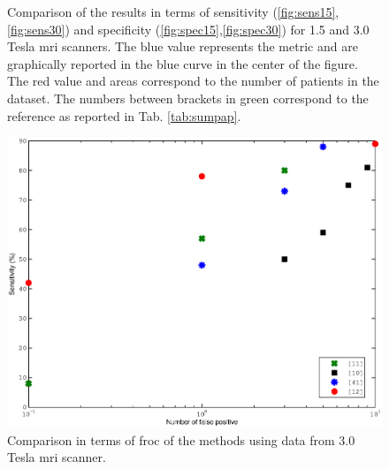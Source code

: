 \begin{figure}
{
  }
  \hspace*{\fill}
  \caption{Comparison of the results in terms of sensitivity (\ref{fig:sens15},\ref{fig:sens30}) and specificity (\ref{fig:spec15},\ref{fig:spec30}) for 1.5 and 3.0 Tesla \ac{mri} scanners. The {\color{blue}blue} value represents the metric and are graphically reported in the blue curve in the center of the figure. The {\color{red}red} value and areas correspond to the number of patients in the dataset. The numbers between brackets in {\color{semiAuto}green} correspond to the reference as reported in Tab. \ref{tab:sumpap}.}
  \label{fig:sensspec}
\end{figure}

\begin{figure}
  \centering
  \includegraphics[width=.6\linewidth]{12_figures/figures/froc/froc.eps}
  \caption{Comparison in terms of \ac{froc} of the methods using data from 3.0 Tesla \ac{mri} scanner.}
  \label{fig:froc}
\end{figure}

